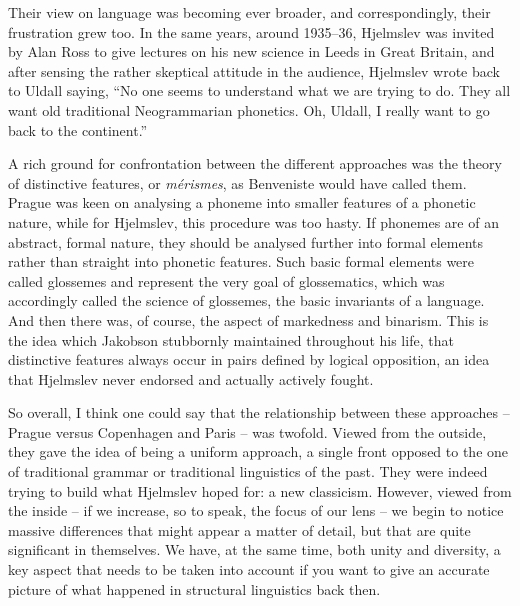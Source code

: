 \begin{styleStandard}
Their view on language was becoming ever broader, and correspondingly, their frustration grew too. In the same years, around 1935–36, Hjelmslev was invited by Alan Ross to give lectures on his new science in Leeds in Great Britain, and after sensing the rather skeptical attitude in the audience, Hjelmslev wrote back to Uldall saying, “No one seems to understand what we are trying to do. They all want old traditional Neogrammarian phonetics. Oh, Uldall, I really want to go back to the continent.” 
\end{styleStandard}

\begin{styleStandard}
A rich ground for confrontation between the different approaches was the theory of distinctive features, or \textit{mérismes}, as Benveniste would have called them. Prague was keen on analysing a phoneme into smaller features of a phonetic nature, while for Hjelmslev, this procedure was too hasty. If phonemes are of an abstract, formal nature, they should be analysed further into formal elements rather than straight into phonetic features. Such basic formal elements were called glossemes and represent the very goal of glossematics, which was accordingly called the science of glossemes, the basic invariants of a language. And then there was, of course, the aspect of markedness and binarism. This is the idea which Jakobson stubbornly maintained throughout his life, that distinctive features always occur in pairs defined by logical opposition, an idea that Hjelmslev never endorsed and actually actively fought. 
\end{styleStandard}

\begin{styleStandard}
So overall, I think one could say that the relationship between these approaches – Prague versus Copenhagen and Paris – was twofold. Viewed from the outside, they gave the idea of being a uniform approach, a single front opposed to the one of traditional grammar or traditional linguistics of the past. They were indeed trying to build what Hjelmslev hoped for: a new classicism. However, viewed from the inside – if we increase, so to speak, the focus of our lens – we begin to notice massive differences that might appear a matter of detail, but that are quite significant in themselves. We have, at the same time, both unity and diversity, a key aspect that needs to be taken into account if you want to give an accurate picture of what happened in structural linguistics back then.
\end{styleStandard}

